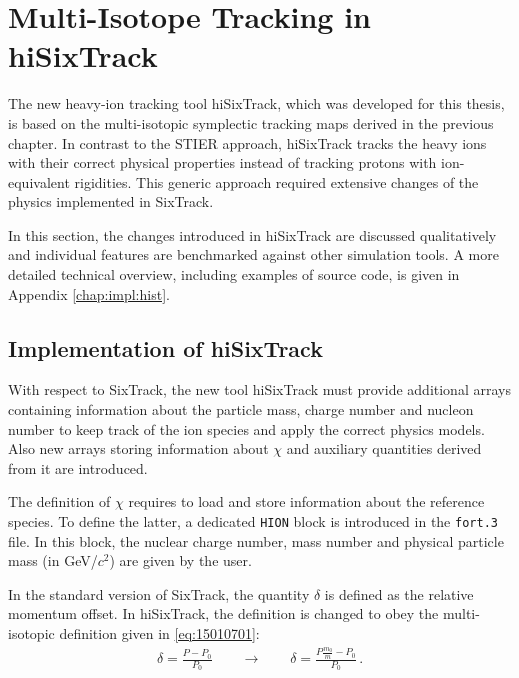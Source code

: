 \newpage
\section{Multi-Isotope Tracking in hiSixTrack}

The new heavy-ion tracking tool hiSixTrack, which was developed for this thesis, is based on the multi-isotopic symplectic tracking maps derived in the previous chapter. In contrast to the STIER approach, hiSixTrack tracks the heavy ions with their correct physical properties instead of tracking protons with ion-equivalent rigidities. This generic approach required extensive changes of the physics implemented in SixTrack. 

\vspace{0.2cm}

In this section, the changes introduced in hiSixTrack are discussed qualitatively and individual features are benchmarked against other simulation tools. A more detailed technical overview, including examples of source code, is given in Appendix \ref{chap:impl:hist}. 



\subsection{Implementation of hiSixTrack} \label{chap:implhst}

With respect to SixTrack, the new tool hiSixTrack must provide additional arrays containing information about the particle mass, charge number and nucleon number to keep track of the ion species and apply the correct physics models. Also new arrays storing information about $\chi$ and auxiliary quantities derived from it are introduced. 
\vspace{0.2cm}

The definition of $\chi$ requires to load and store information about the reference species. To define the latter, a dedicated \texttt{HION} block is introduced in the \texttt{fort.3} file. In this block, the nuclear charge number, mass number and physical particle mass (in GeV/$c^2$) are given by the user. 
\vspace{0.2cm}

In the standard version of SixTrack, the quantity $\delta$ is defined as the relative momentum offset. In hiSixTrack, the definition is changed to obey the multi-isotopic definition given in \eqref{eq:15010701}:
%
\begin{align}
  \delta = \frac{P - P_0}{P_0}\quad \quad  \rightarrow \quad \quad \delta = \frac{P \frac{m_0}{m} - P_0}{P_0} \, .
\end{align}

